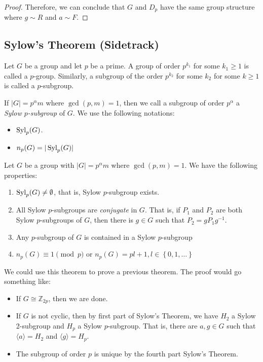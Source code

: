 \begin{proof}
    Therefore, we can conclude that \(G\) and \(D_p\) have the same group structure where \(g \sim R\) and \(a \sim F\).
\end{proof}

\subsection{Sylow's Theorem (Sidetrack)}

\begin{definition}
    Let \(G\) be a group and let \(p\) be a prime. A group of order \(p^{k_1}\) for some \(k_1 \geq 1\) is called a \(p\)-group. Similarly, a subgroup of the order \(p^{k_2}\) for some \(k_2\) for some \(k \geq 1\) is called a \(p\)-subgroup.
\end{definition}

\begin{definition}
    If \(|G| = p^\alpha m\) where \(\gcd(p, m) = 1\), then we call a subgroup of order \(p^\alpha\) a \textit{Sylow \(p\)-subgroup} of \(G\). We use the following notations:
    \begin{itemize}
        \item \(\operatorname{Syl}_p(G)\).
        \item \(n_p(G) = |\operatorname{Syl}_p(G)|\)
    \end{itemize}
\end{definition}

\begin{theorem}
    Let \(G\) be a group with \(|G| = p^\alpha m\) where \(\gcd(p, m) = 1\). We have the following properties:
    \begin{enumerate}
        \item \(\operatorname{Syl}_p(G) \neq \emptyset\), that is, Sylow \(p\)-subgroup exists.
        \item All Sylow \(p\)-subgroups are \textit{conjugate} in \(G\). That is, if \(P_1\) and \(P_2\) are both Sylow \(p\)-subgroups of \(G\), then there is \(g \in G\) such that \(P_2 = g P_1 g^{-1}\).
        \item Any \(p\)-subgroup of \(G\) is contained in a Sylow \(p\)-subgroup
        \item \(n_p(G) \equiv 1 \pmod p\) or \(n_p(G) = pl + 1, l \in \left\{0, 1, \ldots\right\}\)
    \end{enumerate}
\end{theorem}

We could use this theorem to prove a previous theorem. The proof would go something like:
\begin{itemize}
    \item If \(G \cong \mathbb{Z}_{2p}\), then we are done.
    \item If \(G\) is not cyclic, then by first part of Sylow's Theorem, we have \(H_2\) a Sylow 2-subgroup and \(H_p\) a Sylow \(p\)-subgroup. That is, there are \(a, g \in G\) such that \(\langle a \rangle = H_2\) and \(\langle g \rangle = H_p\). 
    \item The subgroup of order \(p\) is unique by the fourth part Sylow's Theorem.
\end{itemize}
